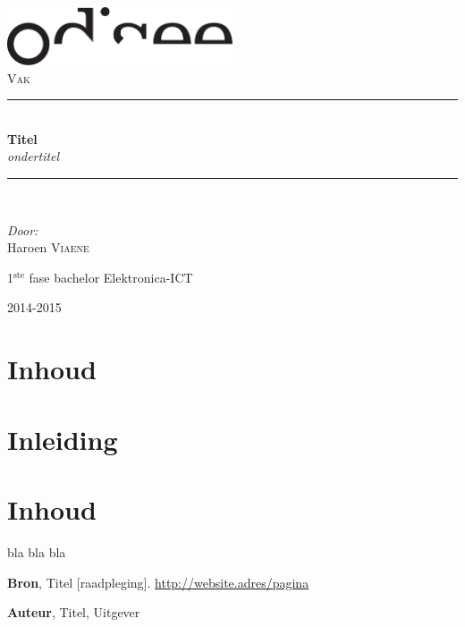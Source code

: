 \documentclass[11pt, a4paper]{article}
\newcommand{\HRule}{\rule{\linewidth}{0.5mm}}
\begin{document}
\begin{titlepage}
\begin{center}
\includegraphics[width=0.5\textwidth]{./logo.pdf}~\\[1cm]


\textsc{\Large Vak}\\[0.5cm]

\HRule \\[0.4cm]
{ \LARGE \bfseries Titel}\\[0.4cm]
{\large \textit{ondertitel}}\\[0.2cm]

\HRule \\[1.5cm]

\begin{minipage}{0.4\textwidth}
\begin{flushleft} \large
\emph{Door:}\\
Haroen \textsc{Viaene}\\

\end{flushleft}
\end{minipage}
\begin{minipage}{0.4\textwidth}
\begin{flushright} \large
\large{1$^{\text{ste}}$ fase bachelor Elektronica-ICT}\\
\end{flushright}
\end{minipage}

\vfill

{\large 2014-2015}

\end{center}
\end{titlepage}

\newpage

\section*{Inhoud}

\tableofcontents

\newpage

\section{Inleiding}

\section{Inhoud}

bla bla bla

\newpage

\begin{thebibliography}{9}
	
	\textbf{Bron}, 
	Titel 
	[raadpleging]. 
	\url{http://website.adres/pagina}

	\textbf{Auteur}, 
	Titel, 
	Uitgever

\end{thebibliography}
\end{document}
